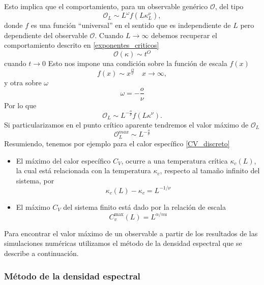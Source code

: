 Esto implica que el comportamiento, para un observable genérico $\mathcal{O}$, del tipo
\begin{equation}
\mathcal{O}_L\sim L^{\omega}f(L \kappa_L^{\nu}),
\end{equation}
donde $f$ es una función ``universal'' en el sentido que es independiente de
$L$ pero dependiente del observable $\mathcal{O}$. Cuando $L\rightarrow \infty$
debemos recuperar el comportamiento descrito en \ref{exponentes_criticos} 
\begin{equation}
\mathcal{O}(\kappa)\sim t^{O}
\end{equation}
cuando $t\rightarrow 0$ Esto nos impone una condición sobre la función de
escala $f(x)$
\begin{equation}
f(x)\sim x^{\frac{O}{\nu}}\quad x\rightarrow \infty ,
\end{equation}
y otra sobre $\omega$
\begin{equation}
\omega=-\frac{o}{\nu}
\end{equation}
Por lo que
\begin{equation}
\mathcal{O}_L\sim L^{-\frac{o}{\nu}}f(L \kappa^{\nu}).
\end{equation}
Si particularizamos en el punto crítico aparente tendremos el valor máximo de
$\mathcal{O}_L$
\begin{equation}
\mathcal{O}^{max}_L\sim L^{-\frac{o}{\nu}}
\end{equation}
Resumiendo, tenemos por ejemplo para el calor específico \eqref{CV_discreto}
\begin{itemize}
\item El máximo del calor específico $C_V$, ocurre a una temperatura crítica
  $\kappa_c(L)$, la cual está relacionada con la temperatura $\kappa_c$,
  respecto al tamaño infinito del sistema, por
\begin{equation}
\kappa_c(L) -\kappa_c= L^{-1/\nu}
\end{equation}
\item El máximo $C_V$ del sistema finito está dado por la relación de
  escala
\begin{equation}
C^{\max}_v(L)=L^{\alpha/nu}
\end{equation}
\end{itemize}

Para encontrar el valor máximo de un observable a partir de los resultados de
las simulaciones numéricas utilizamos el método de la densidad espectral que
se describe a continuación.

\subsubsection{Método de la densidad espectral}

